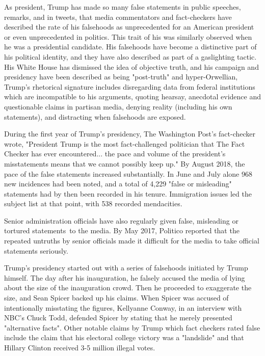 As president, Trump has made so many false statements in public
speeches, remarks, and in tweets, that media commentators and
fact-checkers have described the rate of his falsehoods as unprecedented
for an American president or even unprecedented in politics. This trait
of his was similarly observed when he was a presidential candidate. His
falsehoods have become a distinctive part of his political identity, and
they have also described as part of a gaslighting tactic. His White
House has dismissed the idea of objective truth, and his campaign and
presidency have been described as being "post-truth" and
hyper-Orwellian, Trump's rhetorical signature includes disregarding data
from federal institutions which are incompatible to his arguments,
quoting hearsay, anecdotal evidence and questionable claims in partisan
media, denying reality (including his own statements), and distracting
when falsehoods are exposed.

During the first year of Trump's presidency, The Washington Post's
fact-checker wrote, "President Trump is the most fact-challenged
politician that The Fact Checker has ever encountered... the pace and
volume of the president's misstatements means that we cannot possibly
keep up." By August 2018, the pace of the false statements increased
substantially. In June and July alone 968 new incidences had been noted,
and a total of 4,229 "false or misleading" statements had by then been
recorded in his tenure. Immigration issues led the subject list at that
point, with 538 recorded mendacities.

Senior administration officials have also regularly given false,
misleading or tortured statements~to the media. By May 2017, Politico
reported that the repeated untruths by senior officials made it
difficult for the media to take official statements seriously.

Trump's presidency started out with a series of falsehoods initiated by
Trump himself. The day after his inauguration, he falsely accused the
media of lying about the size of the inauguration crowd. Then he
proceeded to exaggerate the size, and Sean Spicer backed up his claims.
When Spicer was accused of intentionally misstating the figures,
Kellyanne Conway, in an interview with NBC's Chuck Todd, defended Spicer
by stating that he merely presented "alternative facts". Other notable
claims by Trump which fact checkers rated false include the claim that
his electoral college victory was a "landslide" and that Hillary Clinton
received 3-5 million illegal votes.

